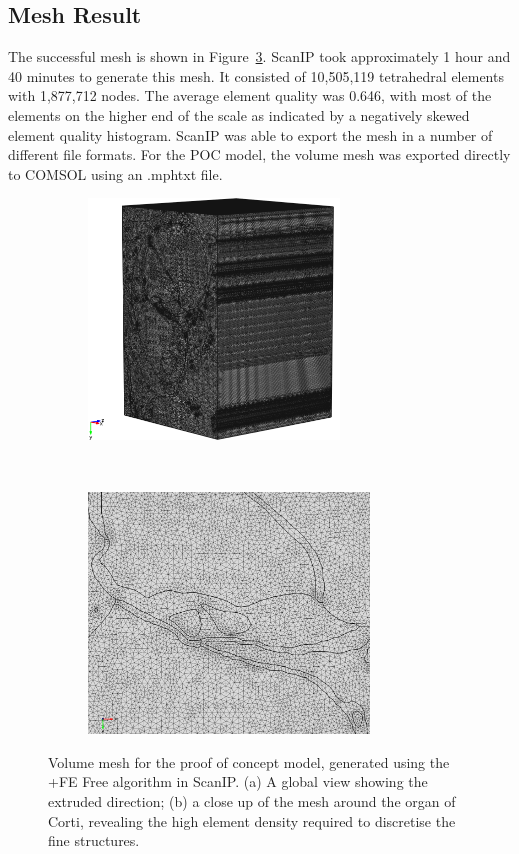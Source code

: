 \subsection{Mesh Result}

The successful mesh is shown in Figure~\ref{fig:poc_mesh}. ScanIP took
approximately 1 hour and 40 minutes to generate this mesh. It consisted of
10,505,119 tetrahedral elements with 1,877,712 nodes. The average element
quality was 0.646, with most of the elements on the higher end of the scale as
indicated by a negatively skewed element quality histogram. ScanIP was able to
export the mesh in a number of different file formats. For the POC model, the
volume mesh was exported directly to COMSOL using an .mphtxt file.

\begin{figure}
	\centering
	
	\begin{subfigure}[t]{0.46\textwidth}
        \centering
        \includegraphics[height=6.4cm]{Methodology/poc_mesh_iso}
        \caption{}
        \label{fig:poc_mesh_iso}
    \end{subfigure}%
    ~~
    \begin{subfigure}[t]{0.52\textwidth}
        \centering
        \includegraphics[height=6.4cm]{Methodology/poc_mesh_zoom}
        \caption{}
        \label{fig:poc_mesh_zoom}
    \end{subfigure}%
    
	\caption[Volume mesh for the proof of concept model]{Volume mesh for the proof
	of concept model, generated using the +FE Free algorithm in ScanIP. (a) A
	global view showing the extruded direction; (b) a close up of the mesh around
	the organ of Corti, revealing the high element density required to discretise
	the fine structures.}
	\label{fig:poc_mesh}
\end{figure}

